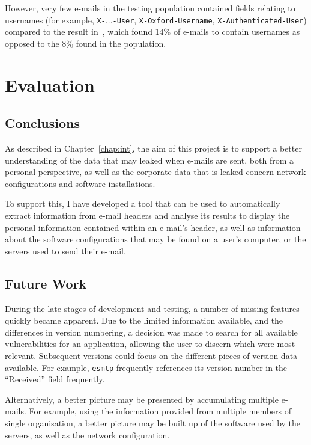 However, very few e-mails in the testing population contained fields relating
to usernames (for example, \texttt{X-}$\ldots$\texttt{-User}, \texttt{X-Oxford-Username},
\texttt{X-Authenticated-User}) compared to the result
in~\cite{nurse2015investigating}, which found 14\% of e-mails to contain
usernames as opposed to the 8\% found in the population.

\cleardoublepage \chapter{Evaluation}
\section{Conclusions}

As described in Chapter~\ref{chap:int}, the aim of this project is to support a
better understanding of the data that may leaked when e-mails are sent, both
from a personal perspective, as well as the corporate data that is leaked
concern network configurations and software installations.

To support this, I have developed a tool that can be used to automatically
extract information from e-mail headers and analyse its results to display the
personal information contained within an e-mail's header, as well as
information about the software configurations that may be found on a user's
computer, or the servers used to send their e-mail.


\section{Future Work}

During the late stages of development and testing, a number of missing features
quickly became apparent. Due to the limited information available, and the
differences in version numbering, a decision was made to search for all
available vulnerabilities for an application, allowing the user to discern
which were most relevant.  Subsequent versions could focus on the different
pieces of version data available.  For example, \texttt{esmtp} frequently
references its version number in the ``Received'' field frequently.

Alternatively, a better picture may be presented by accumulating multiple
e-mails. For example, using the information provided from multiple members of
single organisation, a better picture may be built up of the software used by
the servers, as well as the network configuration.

